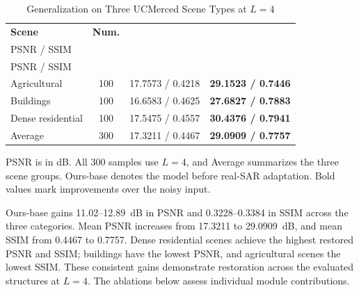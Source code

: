 \documentclass[conference]{IEEEtran}
\begin{document}
\begin{table}[!t]
\caption{Generalization on Three UCMerced Scene Types at \(L=4\)}
\label{tab:ucm_scenes}
\centering
\footnotesize
\setlength{\tabcolsep}{3.0pt}
\renewcommand{\arraystretch}{1.08}
\begin{tabular*}{\columnwidth}{@{\extracolsep{\fill}}lccc@{}}
\toprule
\textbf{Scene} & \textbf{Num.} &
\shortstack{\textbf{Noisy}\\PSNR / SSIM} &
\shortstack{\textbf{Ours-base}\\PSNR / SSIM} \\
\midrule
Agricultural & 100 & 17.7573 / 0.4218 & \textbf{29.1523 / 0.7446} \\
Buildings    & 100 & 16.6583 / 0.4625 & \textbf{27.6827 / 0.7883} \\
Dense residential & 100 & 17.5475 / 0.4557 & \textbf{30.4376 / 0.7941} \\
\midrule
Average      & 300 & 17.3211 / 0.4467 & \textbf{29.0909 / 0.7757} \\
\bottomrule
\end{tabular*}
\vspace{1pt}
\parbox{\columnwidth}{\scriptsize PSNR is in dB. All 300 samples use \(L=4\), and Average summarizes the three scene groups. Ours-base denotes the model before real-SAR adaptation. Bold values mark improvements over the noisy input.}
\end{table}

Ours-base gains 11.02--12.89~dB in PSNR and 0.3228--0.3384 in SSIM across the three categories. Mean PSNR increases from 17.3211 to 29.0909~dB, and mean SSIM from 0.4467 to 0.7757. Dense residential scenes achieve the highest restored PSNR and SSIM; buildings have the lowest PSNR, and agricultural scenes the lowest SSIM. These consistent gains demonstrate restoration across the evaluated structures at \(L=4\). The ablations below assess individual module contributions.
\end{document}
